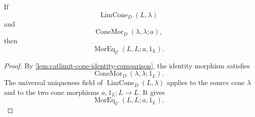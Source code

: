 \begin{proposition}\label{prop:catlimit-limiting-cone-endomorphism-rigidity}
If
$$\operatorname{LimCone}_{D}(L,\lambda)$$
and
$$\operatorname{ConeMor}_{D}(\lambda,\lambda;a),$$
then
$$\operatorname{MorEq}_{\mathcal C}(L,L;a,1_L).$$
\end{proposition}
\begin{proof}
By \autoref{lem:catlimit-cone-identity-comparison}, the identity morphism satisfies
$$\operatorname{ConeMor}_{D}(\lambda,\lambda;1_L).$$
The universal uniqueness field of $\operatorname{LimCone}_{D}(L,\lambda)$ applies to the source cone $\lambda$ and to the two cone morphisms $a,1_L:L\to L$. It gives
$$\operatorname{MorEq}_{\mathcal C}(L,L;a,1_L).$$
\end{proof}

